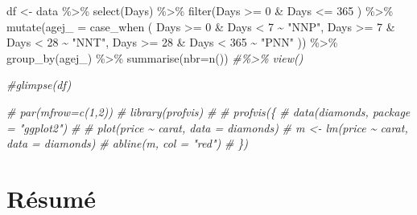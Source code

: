\documentclass[
]{book}
\newenvironment{Shaded}{\begin{snugshade}}{\end{snugshade}}
\newcommand{\AttributeTok}[1]{\textcolor[rgb]{0.77,0.63,0.00}{#1}}
\newcommand{\CommentTok}[1]{\textcolor[rgb]{0.56,0.35,0.01}{\textit{#1}}}
\newcommand{\DecValTok}[1]{\textcolor[rgb]{0.00,0.00,0.81}{#1}}
\newcommand{\FunctionTok}[1]{\textcolor[rgb]{0.00,0.00,0.00}{#1}}
\newcommand{\NormalTok}[1]{#1}
\newcommand{\OtherTok}[1]{\textcolor[rgb]{0.56,0.35,0.01}{#1}}
\newcommand{\SpecialCharTok}[1]{\textcolor[rgb]{0.00,0.00,0.00}{#1}}
\newcommand{\StringTok}[1]{\textcolor[rgb]{0.31,0.60,0.02}{#1}}
\begin{document}
\begin{Shaded}
\begin{Highlighting}[]
\NormalTok{df }\OtherTok{\textless{}{-}}\NormalTok{ data }\SpecialCharTok{\%\textgreater{}\%} 
  \FunctionTok{select}\NormalTok{(Days) }\SpecialCharTok{\%\textgreater{}\%} 
  \FunctionTok{filter}\NormalTok{(Days }\SpecialCharTok{\textgreater{}=} \DecValTok{0} \SpecialCharTok{\&}\NormalTok{ Days }\SpecialCharTok{\textless{}=} \DecValTok{365}\NormalTok{ ) }\SpecialCharTok{\%\textgreater{}\%} 
  \FunctionTok{mutate}\NormalTok{(}\AttributeTok{agej\_ =}
\NormalTok{           case\_when}
\NormalTok{            (}
\NormalTok{             Days }\SpecialCharTok{\textgreater{}=} \DecValTok{0} \SpecialCharTok{\&}\NormalTok{ Days }\SpecialCharTok{\textless{}} \DecValTok{7} \SpecialCharTok{\textasciitilde{}} \StringTok{"NNP"}\NormalTok{,}
\NormalTok{             Days }\SpecialCharTok{\textgreater{}=} \DecValTok{7} \SpecialCharTok{\&}\NormalTok{ Days }\SpecialCharTok{\textless{}} \DecValTok{28} \SpecialCharTok{\textasciitilde{}} \StringTok{"NNT"}\NormalTok{,}
\NormalTok{             Days }\SpecialCharTok{\textgreater{}=} \DecValTok{28} \SpecialCharTok{\&}\NormalTok{ Days }\SpecialCharTok{\textless{}} \DecValTok{365} \SpecialCharTok{\textasciitilde{}} \StringTok{"PNN"}
\NormalTok{             )) }\SpecialCharTok{\%\textgreater{}\%} 
  \FunctionTok{group\_by}\NormalTok{(agej\_) }\SpecialCharTok{\%\textgreater{}\%} 
  \FunctionTok{summarise}\NormalTok{(}\AttributeTok{nbr=}\FunctionTok{n}\NormalTok{()) }\CommentTok{\#\%\textgreater{}\% view()}

\CommentTok{\#glimpse(df)}
\end{Highlighting}
\end{Shaded}

\begin{Shaded}
\begin{Highlighting}[]
\CommentTok{\# par(mfrow=c(1,2))}
\CommentTok{\# library(profvis)}
\CommentTok{\# }
\CommentTok{\# profvis(\{}
\CommentTok{\#   data(diamonds, package = "ggplot2")}
\CommentTok{\# }
\CommentTok{\#   plot(price \textasciitilde{} carat, data = diamonds)}
\CommentTok{\#   m \textless{}{-} lm(price \textasciitilde{} carat, data = diamonds)}
\CommentTok{\#   abline(m, col = "red")}
\CommentTok{\# \})}
\end{Highlighting}
\end{Shaded}

\hypertarget{ruxe9sumuxe9}{%
\chapter{Résumé}\label{ruxe9sumuxe9}}
\end{document}
